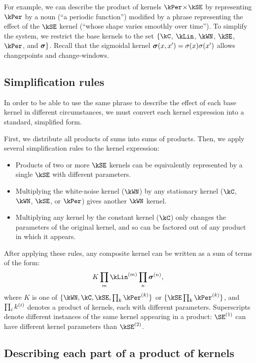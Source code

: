 For example, we can describe the product of kernels $\kPer \kerntimes \kSE$ by representing $\kPer$ by a noun (``a periodic function'') modified by a phrase representing the effect of the $\kSE$ kernel (``whose shape varies smoothly over time'').
To simplify the system, we restrict the base kernels to the set $\{\kC$, $\kLin$, $\kWN$, $\kSE$, $\kPer$, and ${\boldsymbol{\sigma}}\}$.
Recall that the sigmoidal kernel ${\boldsymbol{\sigma}}(x, x') = \sigma(x)\sigma(x')$ allows changepoints and change-windows.


\subsection{Simplification rules}
\label{sec:desc-simplification}

In order to be able to use the same phrase to describe the effect of each base kernel in different circumstances, we must convert each kernel expression into a standard, simplified form.

First, we distribute all products of sums into sums of products.
Then, we apply several simplification rules to the kernel expression:

\begin{itemize}
\item Products of two or more $\kSE$ kernels can be equivalently represented by a single $\kSE$ with different parameters.
\item Multiplying the white-noise kernel ($\kWN$) by any stationary kernel ($\kC$, $\kWN$, $\kSE$, or $\kPer$) gives another $\kWN$ kernel.
\item Multiplying any kernel by the constant kernel ($\kC$) only changes the parameters of the original kernel, and so can be factored out of any product in which it appears.
\end{itemize}

After applying these rules, any composite kernel can be written as a sum of terms of the form:
\begin{align}
K \prod_m \kLin^{(m)} \prod_n \boldsymbol\sigma^{(n)},
\label{eq:sop}
\end{align}
where $K$ is one of $\{\kWN, \kC, \kSE, \prod_k \kPer^{(k)}\}$ or $\{\kSE \prod_k \kPer^{(k)}\}$, 
and $\prod_ik^{(i)}$ denotes a product of kernels, each with different parameters.
Superscripts denote different instances of the same kernel appearing in a product: $\SE^{(1)}$ can have different kernel parameters than $\kSE^{(2)}$.


\subsection{Describing each part of a product of kernels}

